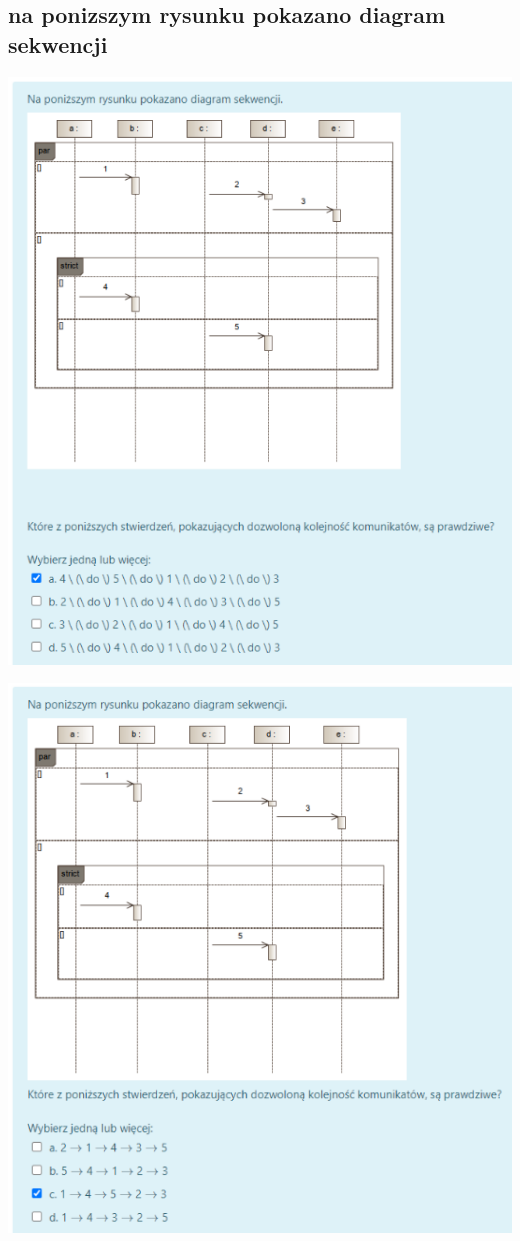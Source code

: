 \documentclass[11pt]{article}
\begin{document}
\subsection{na ponizszym rysunku pokazano diagram sekwencji}
\label{sec:org56a25a5}
\begin{center}
\includegraphics[width=.9\linewidth]{./zadanie3.png}
\end{center}
\begin{center}
\includegraphics[width=.9\linewidth]{./zadanie12.png}
\end{center}
\end{document}
